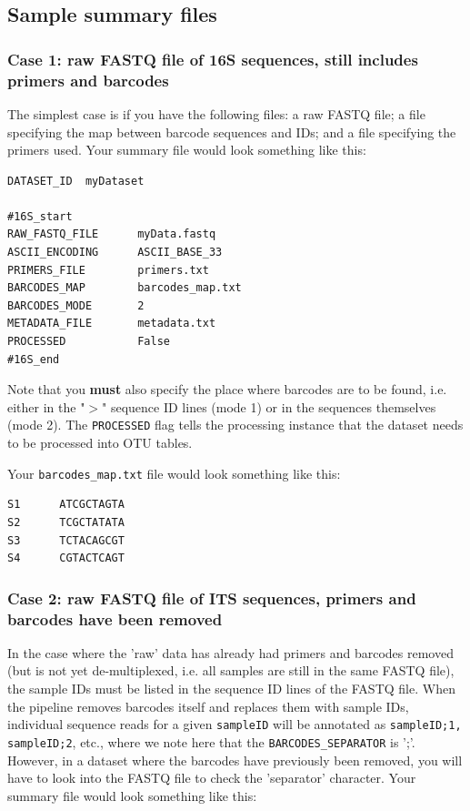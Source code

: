 \documentclass[11pt, oneside]{article}   	%
\begin{document}
\subsection{Sample summary files}

\subsubsection{Case 1: raw FASTQ file of 16S sequences, still includes primers and barcodes}\label{sec:case1}

The simplest case is if you have the following files: a raw FASTQ file; a file specifying the map between barcode sequences and IDs; and a file specifying the primers used.  Your summary file would look something like this:

\begin{verbatim}
DATASET_ID	myDataset

#16S_start
RAW_FASTQ_FILE      myData.fastq
ASCII_ENCODING      ASCII_BASE_33
PRIMERS_FILE        primers.txt
BARCODES_MAP        barcodes_map.txt
BARCODES_MODE       2
METADATA_FILE       metadata.txt
PROCESSED           False
#16S_end
\end{verbatim}
Note that you \textbf{must} also specify the place where barcodes are to be found, i.e. either in the "$>$" sequence ID lines (mode 1) or in the sequences themselves (mode 2).  The {\tt PROCESSED} flag tells the processing instance that the dataset needs to be processed into OTU tables.

Your {\tt barcodes\_map.txt} file would look something like this:

\begin{verbatim}
S1      ATCGCTAGTA
S2      TCGCTATATA
S3      TCTACAGCGT
S4      CGTACTCAGT
\end{verbatim}

\subsubsection{Case 2: raw FASTQ file of ITS sequences, primers and barcodes have been removed}
In the case where the 'raw' data has already had primers and barcodes removed (but is not yet de-multiplexed, i.e. all samples are still in the same FASTQ file), the sample IDs must be listed in the sequence ID lines of the FASTQ file.  When the pipeline removes barcodes itself and replaces them with sample IDs, individual sequence reads for a given {\tt sampleID} will be annotated as {\tt sampleID;1, sampleID;2}, etc., where we note here that the {\tt BARCODES\_SEPARATOR} is ';'.  However, in a dataset where the barcodes have previously been removed, you will have to look into the FASTQ file to check the 'separator' character.  Your summary file would look something like this:
\end{document}

